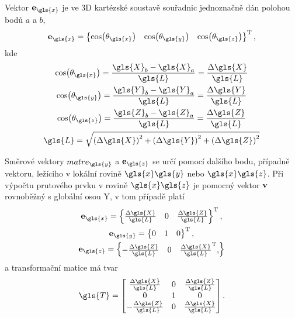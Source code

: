Vektor $\matr{e}_{\gls{x}}$ je ve 3D kartézské soustavě souřadnic jednoznačně dán polohou bodů $a$ a $b$,
\begin{equation}
    \matr{e}_{\gls{x}} = 
    \begin{Bmatrix}
        \cos({\theta_{\gls{x}}}) &
        \cos({\theta_{\gls{y}}}) &
        \cos({\theta_{\gls{z}}})
    \end{Bmatrix}^{\mathrm{T}},
\end{equation}
kde
\begin{equation}
    \begin{gathered}
        \cos({\theta_{\gls{x}}}) = \frac{\gls{X}_b - \gls{X}_a}{\gls{L}} = \frac{\Delta \gls{X}}{\gls{L}} \\
        \cos({\theta_{\gls{y}}}) = \frac{\gls{Y}_b - \gls{Y}_a}{\gls{L}} = \frac{\Delta \gls{Y}}{\gls{L}} \\
        \cos({\theta_{\gls{z}}}) = \frac{\gls{Z}_b - \gls{Z}_a}{\gls{L}} = \frac{\Delta \gls{Z}}{\gls{L}} \\
        \gls{L} = \sqrt{\left(\Delta \gls{X}\right)^2 + \left(\Delta \gls{Y}\right)^2 + \left(\Delta \gls{Z}\right)^2}
    \end{gathered}
\end{equation}

Směrové vektory $matr{e}_{\gls{y}}$ a $\matr{e}_{\gls{z}}$ se určí pomocí dalšího bodu, případně vektoru, ležíciho v lokální rovině $\gls{x}\gls{y}$ nebo $\gls{x}\gls{z}$.
Při výpočtu prutového prvku v rovině $\gls{x}\gls{z}$ je pomocný vektor $\mathbf{v}$ rovnoběžný s globální osou \gls{Y}, v tom případě platí
\begin{equation}
    \begin{gathered}
        \matr{e}_{\gls{x}}
        = 
        \begin{Bmatrix}
            \frac{\Delta \gls{X}}{\gls{L}} &
            0 &
            \frac{\Delta \gls{Z}}{\gls{L}}
        \end{Bmatrix}^{\mathrm{T}}, 
        \\
        \matr{e}_{\gls{y}} 
        = 
        \begin{Bmatrix}
            0 & 1 & 0\\
        \end{Bmatrix}^{\mathrm{T}},
        \\
        \matr{e}_{\gls{z}}
        =
        \begin{Bmatrix}
            - \frac{\Delta \gls{Z}}{\gls{L}} &
            0 &
            \frac{\Delta \gls{X}}{\gls{L}}^{\mathrm{T}},
        \end{Bmatrix}
    \end{gathered}
\end{equation}
a transformační matice má tvar
\begin{equation}
    \gls{T}
    =
    \begin{bmatrix}
        \frac{\Delta \gls{X}}{\gls{L}} & 0 & \frac{\Delta \gls{Z}}{\gls{L}} \\
        0 & 1 & 0 \\
        - \frac{\Delta \gls{Z}}{\gls{L}} &
        0 &
        \frac{\Delta \gls{X}}{\gls{L}}
    \end{bmatrix}.
\end{equation}

